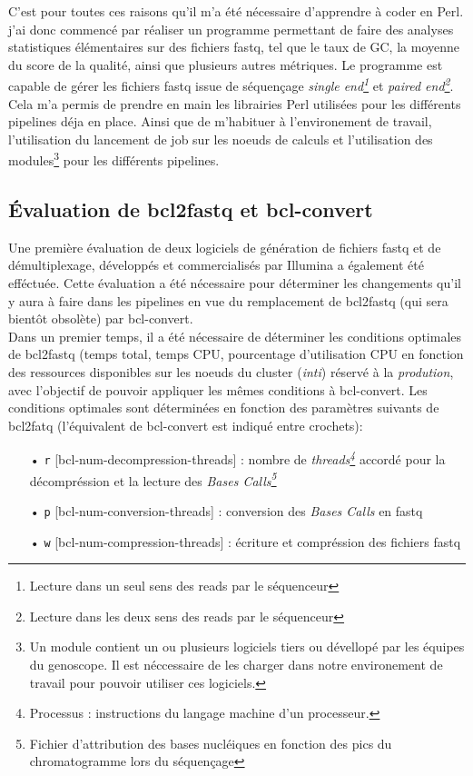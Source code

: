 C'est pour toutes ces raisons qu'il m'a été nécessaire d'apprendre à coder en Perl. j'ai donc commencé par réaliser un programme permettant de faire des analyses statistiques élémentaires sur des fichiers fastq, tel que le taux de GC, la moyenne du score de la qualité, ainsi que plusieurs autres métriques. Le programme est capable de gérer les fichiers fastq issue de séquençage \emph{single end\footnote{Lecture dans un seul sens des reads par le séquenceur}} et \emph{paired end\footnote{Lecture dans les deux sens des reads par le séquenceur}}. Cela m'a permis de prendre en main les librairies Perl utilisées pour les différents pipelines déja en place. Ainsi que de m'habituer à l'environement de travail, l'utilisation du lancement de job sur les noeuds de calculs et l'utilisation des modules\footnote{Un module contient un ou plusieurs logiciels tiers ou dévellopé par les équipes du genoscope. Il est néccessaire de les charger dans notre environement de travail pour pouvoir utiliser ces logiciels.} pour les différents pipelines.

\subsection{Évaluation de bcl2fastq et bcl-convert}
Une première évaluation de deux logiciels de génération de fichiers fastq et de démultiplexage, développés et commercialisés par Illumina a également été efféctuée. Cette évaluation a été nécessaire pour déterminer les changements qu'il y aura à faire dans les pipelines en vue du remplacement de bcl2fastq (qui sera bientôt obsolète) par bcl-convert.\\

Dans un premier temps, il a été nécessaire de déterminer les conditions optimales de bcl2fastq (temps total, temps CPU, pourcentage d'utilisation CPU en fonction des ressources disponibles sur les noeuds du cluster (\emph{inti}) réservé à la \emph{prodution}, avec l'objectif de pouvoir appliquer les mêmes conditions à bcl-convert. Les conditions optimales sont déterminées en fonction des paramètres suivants de bcl2fatq (l'équivalent de bcl-convert est indiqué entre crochets): \\
\begin{itemize}
    \item[•] \texttt{r} [bcl-num-decompression-threads] : nombre de \emph{threads\footnote{Processus : instructions du langage machine d'un processeur.}} accordé pour la décompréssion et la lecture des \emph{Bases Calls\footnote{Fichier d'attribution des bases nucléiques en fonction des pics du chromatogramme lors du séquençage}}
    \item[•] \texttt{p} [bcl-num-conversion-threads] : conversion des \emph{Bases Calls} en fastq
    \item[•] \texttt{w} [bcl-num-compression-threads] : écriture et compréssion des fichiers fastq\\
\end{itemize}


